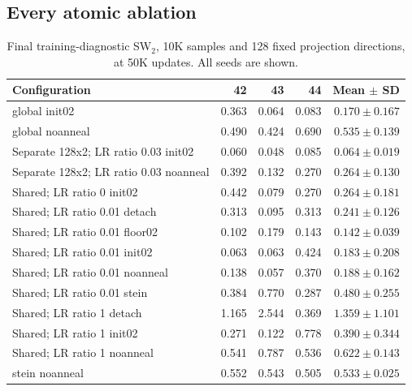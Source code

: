 \documentclass[11pt,a4paper]{article}
\begin{document}
\subsection{Every atomic ablation}
\begin{table}[H]\centering\small
\caption{Final training-diagnostic SW$_2$, 10K samples and 128 fixed projection directions, at 50K updates. All seeds are shown.}
\begin{tabular}{@{}>{\raggedright\arraybackslash}p{5cm}rrrr@{}}
\toprule
Configuration & 42 & 43 & 44 & Mean $\pm$ SD \\ \midrule
global init02 & 0.363 & 0.064 & 0.083 & $0.170\pm0.167$ \\
global noanneal & 0.490 & 0.424 & 0.690 & $0.535\pm0.139$ \\
Separate 128x2; LR ratio 0.03 init02 & 0.060 & 0.048 & 0.085 & $0.064\pm0.019$ \\
Separate 128x2; LR ratio 0.03 noanneal & 0.392 & 0.132 & 0.270 & $0.264\pm0.130$ \\
Shared; LR ratio 0 init02 & 0.442 & 0.079 & 0.270 & $0.264\pm0.181$ \\
Shared; LR ratio 0.01 detach & 0.313 & 0.095 & 0.313 & $0.241\pm0.126$ \\
Shared; LR ratio 0.01 floor02 & 0.102 & 0.179 & 0.143 & $0.142\pm0.039$ \\
Shared; LR ratio 0.01 init02 & 0.063 & 0.063 & 0.424 & $0.183\pm0.208$ \\
Shared; LR ratio 0.01 noanneal & 0.138 & 0.057 & 0.370 & $0.188\pm0.162$ \\
Shared; LR ratio 0.01 stein & 0.384 & 0.770 & 0.287 & $0.480\pm0.255$ \\
Shared; LR ratio 1 detach & 1.165 & 2.544 & 0.369 & $1.359\pm1.101$ \\
Shared; LR ratio 1 init02 & 0.271 & 0.122 & 0.778 & $0.390\pm0.344$ \\
Shared; LR ratio 1 noanneal & 0.541 & 0.787 & 0.536 & $0.622\pm0.143$ \\
stein noanneal & 0.552 & 0.543 & 0.505 & $0.533\pm0.025$ \\
\bottomrule\end{tabular}\end{table}
\end{document}

